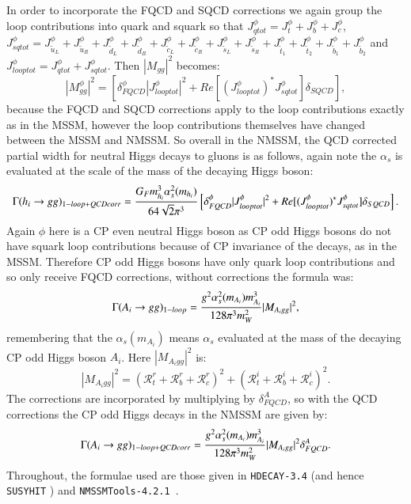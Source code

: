 \documentclass[final,3p,times]{elsarticle}
\begin{document}
In order to incorporate the FQCD and SQCD corrections we again group the loop contributions into quark and squark so that $J_{qtot}^\phi = J_{t}^\phi + J_{b}^\phi + J_{c}^\phi$, $J_{sqtot}^\phi = J_{\tilde{u}_L}^\phi + J_{\tilde{u}_R}^\phi + J_{\tilde{d}_L}^\phi + J_{\tilde{d}_R}^\phi + J_{\tilde{c}_L}^\phi + J_{\tilde{c}_R}^\phi + J_{\tilde{s}_L}^\phi + J_{\tilde{s}_R}^\phi + J_{\tilde{t}_1}^\phi + J_{\tilde{t}_2}^\phi + J_{\tilde{b}_1}^\phi + J_{\tilde{b}_2}^\phi$ and $J_{looptot}^\phi = J_{qtot}^\phi + J_{sqtot}^\phi$.
Then $|M_{gg}|^2$ becomes:
\begin{equation}
|M_{gg}^\phi|^2 = \left[\delta_{FQCD}^\phi|J_{looptot}^\phi|^2 + Re[({J_{looptot}^\phi})^* J_{sqtot}^\phi]\delta_{SQCD}\right],
\end{equation}
because the FQCD and SQCD corrections apply to the loop contributions exactly as in the MSSM, however the loop contributions themselves have changed between the MSSM and NMSSM\@.
So overall in the NMSSM, the QCD corrected partial width for neutral Higgs decays to gluons is as follows, again note the $\alpha_s$ is evaluated at the scale of the mass of the decaying Higgs boson:
\begin{equation} \label{hggQCDcorrNMSSM}
\Gamma(h_{i} \rightarrow gg)_{1-loop + QCDcorr} = {G_{F} m_{h_i}^3 \alpha_{s}^2 (m_{h_i}) \over 64 \sqrt{2} \pi^3} \left[\delta_{FQCD}^\phi|J_{looptot}^\phi|^2 + Re[({J_{looptot}^\phi})^* J_{sqtot}^\phi]\delta_{SQCD}\right].
\end{equation}	
Again $\phi$ here is a CP even neutral Higgs boson as CP odd Higgs bosons do not have squark loop contributions because of CP invariance of the decays, as in the MSSM\@. Therefore CP odd Higgs bosons have only quark loop contributions and so only receive FQCD corrections, without corrections the formula was:
\begin{equation} \label{AggnormNMSSM}
\Gamma(A_i \rightarrow g g)_{1-loop} = {g^2 \alpha_s^2 (m_{A_i}) m_{A_i}^3 \over 128 \pi^3 m_{W}^2} |M_{A_i gg}|^2,
\end{equation}
remembering that the $\alpha_s (m_{A_i})$ means $\alpha_s$ evaluated at the mass of the decaying CP odd Higgs boson $A_i$. Here $|M_{A_i gg}|^2$ is:
\begin{equation}
|M_{A_i gg}|^2 = (\mathcal{R}_{t}^{r} + \mathcal{R}_{b}^{r} + \mathcal{R}_{c}^{r})^2 + (\mathcal{R}_{t}^{i} + \mathcal{R}_{b}^{i} + \mathcal{R}_{c}^{i})^2.
\end{equation}
The corrections are incorporated by multiplying by $\delta_{FQCD}^A$, so with the QCD corrections the CP odd Higgs decays in the NMSSM are given by:
\begin{equation} \label{AggQCDcorrNMSSM}
\Gamma(A_i \rightarrow g g)_{1-loop + QCDcorr} = {g^2 \alpha_s^2 (m_{A_i}) m_{A_i}^3 \over 128 \pi^3 m_{W}^2} |M_{A_i gg}|^2 \delta_{FQCD}^A.
\end{equation}
Throughout, the formulae used are those given in {\tt HDECAY-3.4} \cite{Djouadi:1997yw} (and hence {\tt SUSYHIT} \cite{Djouadi:2006bz}) and {\tt NMSSMTools-4.2.1}~\citep{Allanach:2001kg,Ellwanger:2012dd,Ellwanger:2006ch}.


%

\end{document}
